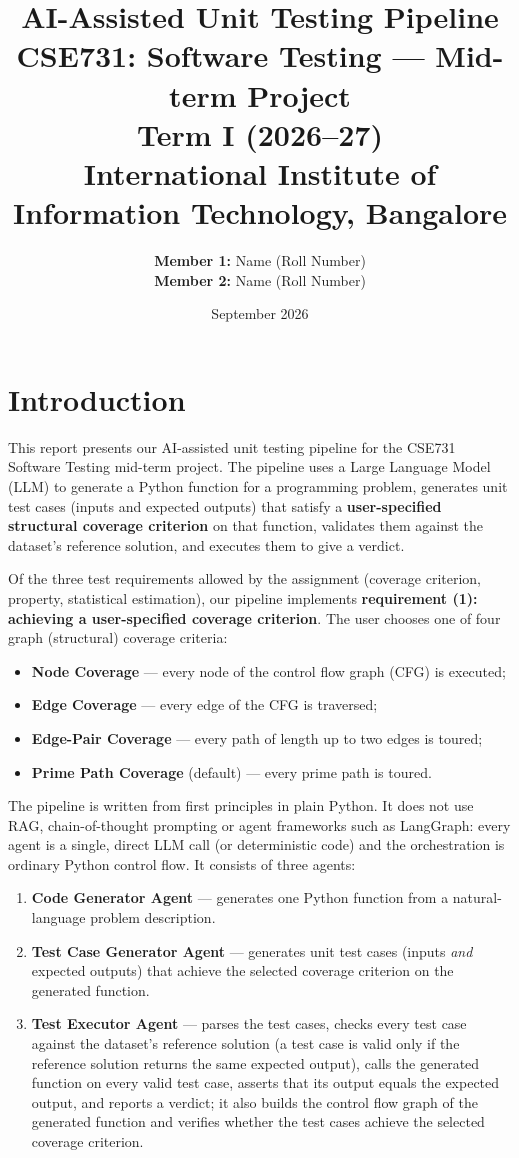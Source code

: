 \documentclass[12pt, a4paper]{article}
\title{
    \vspace{-1cm}
    \textbf{AI-Assisted Unit Testing Pipeline} \\[0.3cm]
    \large CSE731: Software Testing --- Mid-term Project \\[0.2cm]
    \large Term I (2026--27) \\[0.5cm]
    \normalsize International Institute of Information Technology, Bangalore
}
\author{
    \textbf{Member 1:} Name (Roll Number) \\
    \textbf{Member 2:} Name (Roll Number)
}
\date{September 2026}
\begin{document}
\maketitle
\thispagestyle{fancy}

\section{Introduction}

This report presents our AI-assisted unit testing pipeline for the CSE731 Software Testing mid-term project. The pipeline uses a Large Language Model (LLM) to generate a Python function for a programming problem, generates unit test cases (inputs and expected outputs) that satisfy a \textbf{user-specified structural coverage criterion} on that function, validates them against the dataset's reference solution, and executes them to give a verdict.

Of the three test requirements allowed by the assignment (coverage criterion, property, statistical estimation), our pipeline implements \textbf{requirement (1): achieving a user-specified coverage criterion}. The user chooses one of four graph (structural) coverage criteria:
\begin{itemize}
    \item \textbf{Node Coverage} --- every node of the control flow graph (CFG) is executed;
    \item \textbf{Edge Coverage} --- every edge of the CFG is traversed;
    \item \textbf{Edge-Pair Coverage} --- every path of length up to two edges is toured;
    \item \textbf{Prime Path Coverage} (default) --- every prime path is toured.
\end{itemize}

The pipeline is written from first principles in plain Python. It does not use RAG, chain-of-thought prompting or agent frameworks such as LangGraph: every agent is a single, direct LLM call (or deterministic code) and the orchestration is ordinary Python control flow. It consists of three agents:
\begin{enumerate}
    \item \textbf{Code Generator Agent} --- generates one Python function from a natural-language problem description.
    \item \textbf{Test Case Generator Agent} --- generates unit test cases (inputs \emph{and} expected outputs) that achieve the selected coverage criterion on the generated function.
    \item \textbf{Test Executor Agent} --- parses the test cases, checks every test case against the dataset's reference solution (a test case is valid only if the reference solution returns the same expected output), calls the generated function on every valid test case, asserts that its output equals the expected output, and reports a verdict; it also builds the control flow graph of the generated function and verifies whether the test cases achieve the selected coverage criterion.
\end{enumerate}
\end{document}
